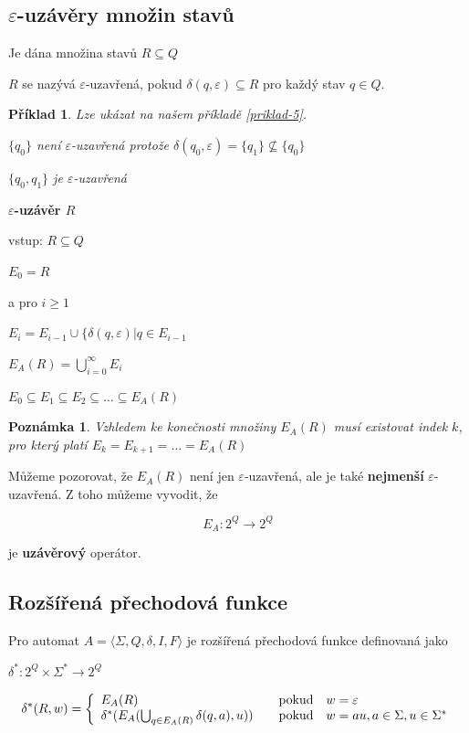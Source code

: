 \documentclass[10pt, a4paper, titlepage]{article}
\theoremstyle{note}
\newtheorem{priklad}{\textbf{Příklad}}
\newtheorem{poznamka}{\textbf{Poznámka}}
\begin{document}
\subsection{$\varepsilon$-uzávěry množin stavů}

Je dána množina stavů $R \subseteq Q$

$R$ se nazývá $\varepsilon$-uzavřená, pokud $ \delta (q,\varepsilon) \subseteq R$ pro každý stav $ q \in Q$.

\begin{priklad}
Lze ukázat na našem příkladě \ref{priklad-5}.

$\lbrace q_0 \rbrace $ není $\varepsilon$-uzavřená protože $\delta(q_0,\varepsilon) = \lbrace q_1 \rbrace \nsubseteq \lbrace q_0 \rbrace$

$\lbrace q_0,q_1 \rbrace$ je $\varepsilon$-uzavřená
\end{priklad}

\textbf{$\varepsilon$-uzávěr $R$}

vstup: $R \subseteq Q$

\quad$E_0=R$

a pro $i \geq 1$

\quad$E_i=E_{i-1} \cup \lbrace \delta (q,\varepsilon) | q \in E_{i-1}$

\quad$E_A(R)=\bigcup_{i=0}^\infty E_i$

\quad$E_0 \subseteq E_1 \subseteq E_2 \subseteq \ldots \subseteq E_A(R)$

\begin{poznamka}
Vzhledem ke konečnosti množiny $E_A(R)$ musí existovat indek $k$, pro který platí $E_k = E_{k+1} = \ldots = E_A(R)$
\end{poznamka}

Můžeme pozorovat, že $E_A(R)$ není jen $\varepsilon$-uzavřená, ale je také \textbf{nejmenší} $\varepsilon$-uzavřená. Z toho můžeme vyvodit, že 

$$E_A:2^Q \rightarrow 2^Q$$

je \textbf{uzávěrový} operátor.

\subsection{Rozšířená přechodová funkce}

Pro automat $A = \langle \Sigma,Q,\delta,I,F \rangle$ je rozšířená přechodová funkce definovaná jako

$\delta^*:2^Q \times \Sigma^* \rightarrow 2^Q$

$$
\delta^*(R,w)=\left\{
\begin{array}{l@{\quad\mbox{}\quad}l}
E_A(R) & \text{pokud}\quad w=\varepsilon\\
\delta^*(E_A(\bigcup_{q \in E_A(R)}\delta(q,a),u))& \text{pokud}\quad w=au,a\in\Sigma,u\in\Sigma^*\\
\end{array}
\right.
$$
\end{document}
